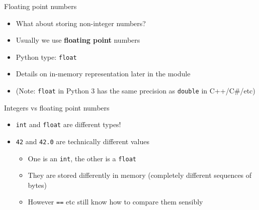 
\begin{frame}{Floating point numbers}
	\begin{itemize}
		\pause\item What about storing non-integer numbers?
		\pause\item Usually we use \textbf{floating point} numbers
		\pause\item Python type: \lstinline{float}
		\pause\item Details on in-memory representation later in the module
		\pause\item (Note: \lstinline{float} in Python 3 has the same precision as \lstinline{double} in C++/C\#/etc)
	\end{itemize}
\end{frame}

\begin{frame}{Integers vs floating point numbers}
	\begin{itemize}
		\pause\item \lstinline{int} and \lstinline{float} are different types!
		\pause\item \lstinline{42} and \lstinline{42.0} are technically different values
			\begin{itemize}
				\pause\item One is an \lstinline{int}, the other is a \lstinline{float}
				\pause\item They are stored differently in memory (completely different sequences of bytes)
				\pause\item However \lstinline{==} etc still know how to compare them sensibly
			\end{itemize}
	\end{itemize}
\end{frame}

